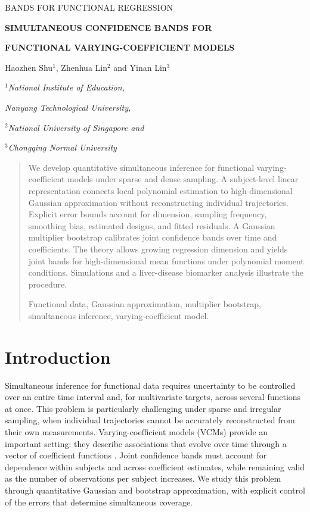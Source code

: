 \documentclass[12pt]{article}
\numberwithin{equation}{section}
\newcommand{\bodyfont}{\fontsize{12}{14pt plus.8pt minus .6pt}\selectfont}
\begin{document}
\renewcommand{\baselinestretch}{2}
\bodyfont
{}
{\hfill{\footnotesize\rm BANDS FOR FUNCTIONAL REGRESSION}\hfill}
\thispagestyle{firstpage}
$\ $\par\vspace{0.8pc}
\centerline{\large\bf SIMULTANEOUS CONFIDENCE BANDS FOR}
\vspace{2pt}
\centerline{\large\bf FUNCTIONAL VARYING-COEFFICIENT MODELS}
\vspace{.4cm}
\centerline{Haozhen Shu$^1$, Zhenhua Lin$^2$ and Yinan Lin$^3$}
\vspace{.4cm}
\centerline{\it $^1$National Institute of Education,}
\centerline{\it Nanyang Technological University,}
\centerline{\it $^2$National University of Singapore and}
\centerline{\it $^3$Chongqing Normal University}
\vspace{.55cm}

\fontsize{9}{11.5pt plus.8pt minus.6pt}\selectfont
\begin{quotation}
 We develop quantitative simultaneous inference for functional varying-coefficient models under sparse and dense sampling. A subject-level linear representation connects local polynomial estimation to high-dimensional Gaussian approximation without reconstructing individual trajectories. Explicit error bounds account for dimension, sampling frequency, smoothing bias, estimated designs, and fitted residuals. A Gaussian multiplier bootstrap calibrates joint confidence bands over time and coefficients. The theory allows growing regression dimension and yields joint bands for high-dimensional mean functions under polynomial moment conditions. Simulations and a liver-disease biomarker analysis illustrate the procedure.
\par
\vspace{9pt}
 Functional data, Gaussian approximation, multiplier bootstrap, simultaneous inference, varying-coefficient model.
\end{quotation}
\bodyfont
\section{Introduction}\label{sec:intro}

Simultaneous inference for functional data requires uncertainty to be controlled over an entire time interval and, for multivariate targets, across several functions at once. This problem is particularly challenging under sparse and irregular sampling, when individual trajectories cannot be accurately reconstructed from their own measurements. Varying-coefficient models (VCMs) provide an important setting: they describe associations that evolve over time through a vector of coefficient functions \citep{hastie_tibshirani_1993,gu_et_al_2014,cao_simultaneous_2018}. Joint confidence bands must account for dependence within subjects and across coefficient estimates, while remaining valid as the number of observations per subject increases. We study this problem through quantitative Gaussian and bootstrap approximation, with explicit control of the errors that determine simultaneous coverage.
\end{document}
